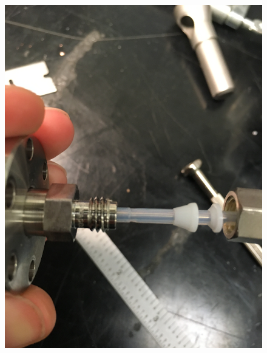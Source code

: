 \begin{figure}[htbp]
\begin{minipage}{0.47\textwidth}
    \includegraphics[width=\linewidth, angle=270]{figures/testbed/ft5_1.jpg}
    \end{minipage}
    \hspace{\fill} %
    \begin{minipage}{0.47\textwidth}

\end{minipage}
\end{figure}
